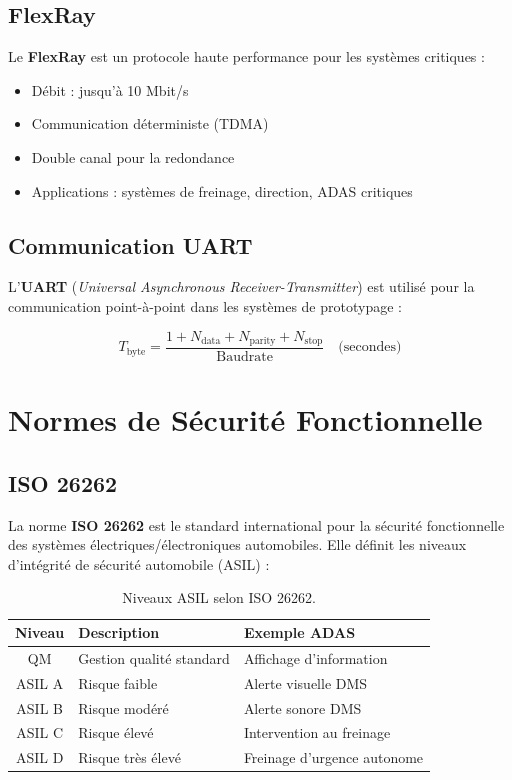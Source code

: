 \documentclass[12pt,a4paper,twoside]{report}
\newcommand{\keyword}[1]{\textbf{\textcolor{stellantisblue}{#1}}}
\begin{document}
\subsection{FlexRay}

Le \keyword{FlexRay} \cite{flexray2010} est un protocole haute performance pour les systèmes critiques :

\begin{itemize}
    \item Débit : jusqu'à 10 Mbit/s
    \item Communication déterministe (TDMA)
    \item Double canal pour la redondance
    \item Applications : systèmes de freinage, direction, ADAS critiques
\end{itemize}

\subsection{Communication UART}

L'\keyword{UART} (\textit{Universal Asynchronous Receiver-Transmitter}) est utilisé pour la communication point-à-point dans les systèmes de prototypage :

\begin{equation}
T_{\text{byte}} = \frac{1 + N_{\text{data}} + N_{\text{parity}} + N_{\text{stop}}}{\text{Baudrate}} \quad \text{(secondes)}
\label{eq:uart_timing}
\end{equation}

\section{Normes de Sécurité Fonctionnelle}

\subsection{ISO 26262}

La norme \keyword{ISO 26262} \cite{iso26262} est le standard international pour la sécurité fonctionnelle des systèmes électriques/électroniques automobiles. Elle définit les niveaux d'intégrité de sécurité automobile (ASIL) :

\begin{table}[H]
\centering
\caption{Niveaux ASIL selon ISO 26262.}
\label{tab:asil}
\renewcommand{\arraystretch}{1.3}
\begin{tabular}{|c|l|l|}
\hline
\rowcolor{stellantisblue!15}
\textbf{Niveau} & \textbf{Description} & \textbf{Exemple ADAS} \\
\hline
QM & Gestion qualité standard & Affichage d'information \\
\hline
ASIL A & Risque faible & Alerte visuelle DMS \\
\hline
ASIL B & Risque modéré & Alerte sonore DMS \\
\hline
ASIL C & Risque élevé & Intervention au freinage \\
\hline
ASIL D & Risque très élevé & Freinage d'urgence autonome \\
\hline
\end{tabular}
\end{table}
\end{document}
